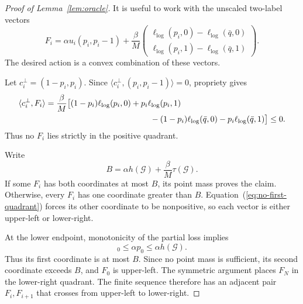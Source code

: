 \documentclass{article}
\begin{document}
\begin{proof}[Proof of Lemma~\ref{lem:oracle}]
It is useful to work with the unscaled two-label vectors
\begin{equation}
 F_i=\alpha u_i(p_i,p_i-1)
 +\frac{\beta}{M}
 \begin{pmatrix}
 \ell_{\log}(p_i,0)-\ell_{\log}(\bar q,0)\\
 \ell_{\log}(p_i,1)-\ell_{\log}(\bar q,1)
 \end{pmatrix}.
 \label{eq:Fi}
\end{equation}
The desired action is a convex combination of these vectors.

Let $c_i^\perp=(1-p_i,p_i)$. Since $\langle c_i^\perp,(p_i,p_i-1)\rangle=0$, propriety gives
\begin{align}
 \langle c_i^\perp,F_i\rangle
 &=\frac{\beta}{M}
 \big[
 (1-p_i)\ell_{\log}(p_i,0)+p_i\ell_{\log}(p_i,1)\nonumber\\
 &\hspace{45mm}
 -(1-p_i)\ell_{\log}(\bar q,0)
 -p_i\ell_{\log}(\bar q,1)
 \big]\leq0.
 \label{eq:no-first-quadrant}
\end{align}
Thus no $F_i$ lies strictly in the positive quadrant.

Write \[ B=\alpha h(\mathcal G)+\frac{\beta}{M}\tau(\mathcal G). \] If some $F_i$ has both coordinates at most $B$, its point mass proves the claim. Otherwise, every $F_i$ has one coordinate greater than $B$. Equation~(\ref{eq:no-first-quadrant}) forces its other coordinate to be nonpositive, so each vector is either upper-left or lower-right.

At the lower endpoint, monotonicity of the partial loss implies
\begin{equation}
 [F_0]_0\leq\alpha p_0\leq\alpha h(\mathcal G).
 \label{eq:left-endpoint}
\end{equation}
Thus its first coordinate is at most $B$. Since no point mass is sufficient, its second coordinate exceeds $B$, and $F_0$ is upper-left. The symmetric argument places $F_N$ in the lower-right quadrant. The finite sequence therefore has an adjacent pair $F_i,F_{i+1}$ that crosses from upper-left to lower-right.


\end{proof}
\end{document}
